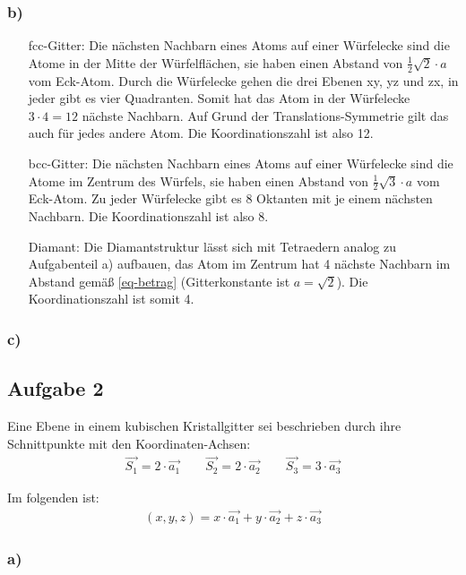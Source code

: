 \documentclass[11pt]{article}
\begin{document}
\subsubsection*{b)}
\begin{itemize}
  \item [fcc-Gitter:] Die nächsten Nachbarn eines Atoms auf einer Würfelecke sind
  die Atome in der Mitte der Würfelflächen, sie haben einen Abstand von
  $\frac{1}{2} \sqrt{2} \cdot a$  vom Eck-Atom. Durch die Würfelecke gehen
  die drei Ebenen xy, yz und zx, in jeder
  gibt es vier Quadranten. Somit hat das Atom in der Würfelecke $3 \cdot 4 = 12$
  nächste Nachbarn. Auf Grund der Translations-Symmetrie gilt das auch für jedes
  andere Atom. Die Koordinationszahl ist also 12.
    \item [bcc-Gitter:] Die nächsten Nachbarn eines Atoms auf einer Würfelecke sind
  die Atome im Zentrum des Würfels, sie haben einen Abstand von $\frac{1}{2} \sqrt{3} \cdot a$
  vom Eck-Atom. Zu jeder Würfelecke gibt es 8 Oktanten mit je einem nächsten Nachbarn.
  Die Koordinationszahl ist also 8.
  \item[Diamant:] Die Diamantstruktur lässt sich mit Tetraedern analog zu
  Aufgabenteil a) aufbauen, das Atom im Zentrum hat 4 nächste Nachbarn im Abstand
  gemäß \eqref{eq-betrag} (Gitterkonstante ist $a = \sqrt{2}$).
  Die Koordinationszahl ist somit 4.
\end{itemize}

\subsubsection*{c)}

\subsection*{Aufgabe 2}

Eine Ebene in einem kubischen Kristallgitter sei beschrieben durch ihre Schnittpunkte mit den Koordinaten-Achsen: 
\begin{align*}
\vec{S_1} = 2\cdot \vec{a_1} \qquad \vec{S_2}=2\cdot\vec{a_2}\qquad
\vec{S_3}=3\cdot\vec{a_3}
\end{align*}

Im folgenden ist:
\begin{align*}
(x,y,z)=x\cdot\vec{a_1}+y\cdot\vec{a_2}+z\cdot\vec{a_3}
\end{align*}

\subsubsection*{a)}
\end{document}
